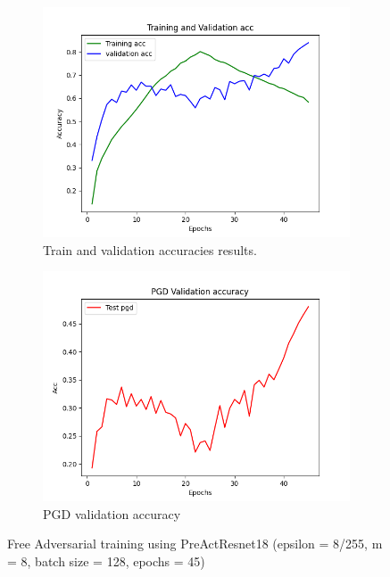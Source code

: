 \documentclass{article}
\begin{document}
\begin{figure}[hbt!]
  \centering
  \begin{subfigure}[b]{0.4\linewidth}
    \includegraphics[width=\linewidth]{images/FreePre/free2.png}
    \caption{ Train and validation accuracies results.}
  \end{subfigure}
  \begin{subfigure}[b]{0.4\linewidth}
    \includegraphics[width=\linewidth]{images/FreePre/free5.png}
    \caption{PGD validation accuracy}
  \end{subfigure}
  \caption{Free Adversarial training using PreActResnet18 (epsilon = 8/255, m = 8, batch size = 128,  epochs = 45)}
  \label{fig:coffee}
\end{figure}
\end{document}
